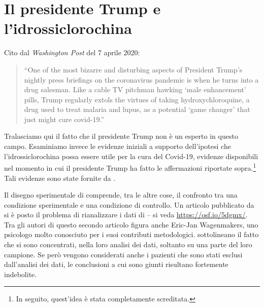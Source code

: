 \section{Il presidente Trump e l'idrossiclorochina}
\label{sec:idrossi}

Cito dal \emph{Washington Post} del 7 aprile 2020:
\begin{quote}
\enquote{One of the most bizarre and disturbing aspects of President Trump's nightly press briefings on the coronavirus pandemic is when he turns into a drug salesman. 
Like a cable TV pitchman hawking \enquote{male enhancement} pills, Trump regularly extols the virtues of taking hydroxychloroquine, a drug used to treat malaria and lupus, as a potential \enquote{game changer} that just might cure covid-19.}
\end{quote} 
Tralasciamo qui il fatto che il presidente Trump non è un esperto in questo campo. 
Esaminiamo invece le evidenze iniziali a supporto dell'ipotesi che l'idrossiclorochina possa essere utile per la cura del Covid-19, evidenze disponibili nel momento in cui il presidente Trump ha fatto le affermazioni riportate sopra.\footnote{In seguito, quest'idea è stata completamente screditata.}
Tali evidenze sono state fornite 
da \citet{Gautret_2020}. 

Il disegno sperimentale di \citet{Gautret_2020} comprende, tra le altre cose, il confronto tra una condizione sperimentale e una condizione di controllo.
Un articolo pubblicato da \citet{Hulme_2020} si è posto il problema di rianalizzare i dati di \citet{Gautret_2020} -- si veda \url{https://osf.io/5dgmx/}.
Tra gli autori di questo secondo articolo figura anche Eric-Jan Wagenmakers, uno psicologo molto conosciuto per i suoi contributi metodologici.
\citet{Hulme_2020} sottolineano il fatto che \citet{Gautret_2020} si sono concentrati, nella loro analisi dei dati, soltanto su una parte del loro campione. 
Se però vengono considerati anche i pazienti che sono stati esclusi dall'analisi dei dati, le conclusioni a cui sono giunti \citet{Gautret_2020} risultano fortemente indebolite.

